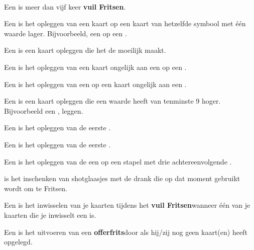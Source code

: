 \newpage
\drawBar{}

\

\item Een  is meer dan vijf keer \textbf{vuil Fritsen}\footnotemark[1].

\item Een  is het opleggen van een kaart op een kaart van hetzelfde symbool met \'e\'en waarde lager. Bijvoorbeeld, een  op een .

\item Een  is een kaart opleggen die het de \andereSpelers moeilijk maakt.

\item Een  is het opleggen van een kaart ongelijk aan een  op een .

\item Een  is het opleggen van een  op een kaart ongelijk aan een .

\item Een  is een kaart opleggen die een waarde heeft van tenminste 9 hoger. Bijvoorbeeld een ,  leggen.

\item Een  is het opleggen van de eerste .

\item Een  is het opleggen van de eerste .

\item Een  is het opleggen van de een  op een stapel met drie achtereenvolgende .

\item {} is het inschenken van shotglaasjes met de drank die op dat moment gebruikt wordt om te Fritsen.

\item Een  is het inwisselen van je kaarten tijdens het \textbf{vuil Fritsen}\footnotemark[1] wanneer één van je kaarten die je inwisselt een  is. 

\item Een  is het uitvoeren van een \textbf{offerfrits}\footnotemark[2] door \Willem als hij/zij nog geen kaart(en) heeft opgelegd.

